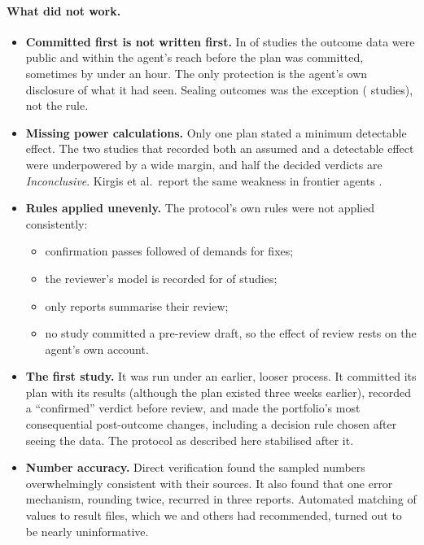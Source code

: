\paragraph{What did not work.}
\begin{itemize}
\item \textbf{Committed first is not written first.} In \InvBlindNone{} of \StudiesTotal{} studies the outcome data
were public and within the agent's reach before the plan was committed, sometimes by under an hour. The only
protection is the agent's own disclosure of what it had seen. Sealing outcomes was the exception (\InvBlindStrong{}
studies), not the rule.
\item \textbf{Missing power calculations.} Only one plan stated a minimum detectable effect. The two studies that
recorded both an assumed and a detectable effect were underpowered by a wide margin, and half the decided verdicts are
\emph{Inconclusive}. Kirgis et al.\ report the same weakness in frontier agents \citep{kirgis2026}.
\item \textbf{Rules applied unevenly.} The protocol's own rules were not applied consistently:
  \begin{itemize}
  \item confirmation passes followed \ReviewConfAmongFix{} of \ReviewFixOrRefuted{} demands for fixes;
  \item the reviewer's model is recorded for \ReviewerModelRecorded{} of \StudiesReported{} studies;
  \item only \ReviewSections{} reports summarise their review;
  \item no study committed a pre-review draft, so the effect of review rests on the agent's own account.
  \end{itemize}
\item \textbf{The first study.} It was run under an earlier, looser process. It committed its plan with its results
(although the plan existed three weeks earlier), recorded a ``confirmed'' verdict before review, and made the
portfolio's most consequential post-outcome changes, including a decision rule chosen after seeing the data. The
protocol as described here stabilised after it.
\item \textbf{Number accuracy.} Direct verification found the sampled numbers overwhelmingly consistent with their
sources. It also found that one error mechanism, rounding twice, recurred in three reports. Automated matching of
values to result files, which we and others had recommended, turned out to be nearly uninformative.
\end{itemize}

